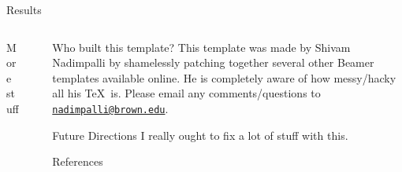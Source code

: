 \documentclass[final]{beamer}
\newlength{\sepwid}
\newlength{\threecolwid}
\newlength{\onehalf}
\begin{document}
\begin{frame}[t]
\begin{columns}[t]
\begin{column}{\threecolwid}
\begin{columns}[t,totalwidth=2\onehalf]
\begin{column}{\onehalf}
\begin{block}{Results}

\lipsum[66]

\lipsum[5]
	
\end{block}







	
	    
\end{column}
 
\end{columns}

\vspace{1cm}


\begin{columns}[t,totalwidth=2\onehalf]	%

\begin{column}{\onehalf}

\begin{block}{More stuff}


	
\end{block}






\end{column}

\begin{column}{\sepwid} \vrule \end{column}	

\begin{column}{\onehalf}


\begin{block}{Who built this template?}
This template was made by Shivam Nadimpalli by shamelessly patching together several other Beamer templates available online. He is completely aware of how messy/hacky all his \TeX\ is. Please email any comments/questions to \href{mailto:nadimpalli@brown.edu}{\texttt{nadimpalli@brown.edu}}.
\end{block}

\begin{alertblock}{Future Directions}
I really ought to fix a lot of stuff with this. 
\end{alertblock}


\begin{block}{References}


\end{block}
\end{column}
\end{columns}
\end{column}
\end{columns}
\end{frame}
\end{document}
